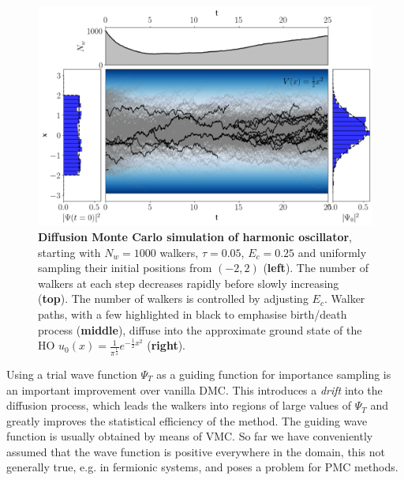 \begin{figure}[h]
	\centering
	\includegraphics[width=\linewidth]{Chapter2/Figs/Raster/dmc.png}
	\caption[DMC simulation of harmonic oscillator]{\textbf{Diffusion Monte Carlo simulation of harmonic oscillator}, starting with $N_w=1000$ walkers, $\tau=0.05$, $E_c=0.25$ and uniformly sampling their initial positions from $(-2, 2)$ (\textbf{left}). The number of walkers at each step decreases rapidly before slowly increasing (\textbf{top}). The number of walkers is controlled by adjusting $E_c$. Walker paths, with a few highlighted in black to emphasise birth/death process (\textbf{middle}), diffuse into the approximate ground state of the HO $u_0(x) = \frac{1}{\pi^{\frac{1}{4}}}e^{-\frac{1}{2}x^2}$ (\textbf{right}).}
	\label{fig:dmc}
\end{figure}
Using a trial wave function $\Psi_T$ as a guiding function for importance sampling is an important improvement over vanilla DMC. This introduces a \emph{drift} into the diffusion process, which leads the walkers into regions of large values of $\Psi_T$ and greatly improves the statistical efficiency of the method. The guiding wave function is usually obtained by means of VMC. So far we have conveniently assumed that the wave function is positive everywhere in the domain, this not generally true, e.g. in fermionic systems, and poses a problem for PMC methods.

